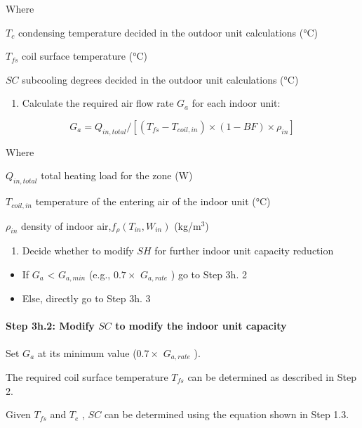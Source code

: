 Where

\(T_c\) condensing temperature decided in the outdoor unit calculations (°C)

\(T_{fs}\) coil surface temperature (°C)

\(SC\) subcooling degrees decided in the outdoor unit calculations (°C)

\begin{enumerate}
\def\labelenumi{\arabic{enumi})}
\setcounter{enumi}{1}
\tightlist
\item
  Calculate the required air flow rate \(G_a\) for each indoor unit:
\end{enumerate}

\begin{equation}
G_a = Q_{in,total}/[(T_{fs}-T_{coil,in})\times{(1-BF)}\times{\rho_{in}}]
\end{equation}

Where

\(Q_{in,total}\) total heating load for the zone (W)

\(T_{coil,in}\) temperature of the entering air of the indoor unit (°C)

\(\rho_{in}\) density of indoor air,\(f_{\rho}(T_{in},W_{in})\) (kg/m\(^{3}\))

\begin{enumerate}
\def\labelenumi{\arabic{enumi})}
\setcounter{enumi}{2}
\tightlist
\item
  Decide whether to modify \(SH\) for further indoor unit capacity reduction
\end{enumerate}

\begin{itemize}
\item
  If \(G_a\) \textless{} \(G_{a,min}\) (e.g., \(0.7\times\) \(G_{a,rate}\) ) go to Step 3h. 2
\item
  Else, directly go to Step 3h. 3
\end{itemize}

\paragraph{Step 3h.2: Modify \(SC\) to modify the indoor unit capacity}\label{step-3h.2-modify-sc-to-modify-the-indoor-unit-capacity}

Set \(G_a\) at its minimum value (\(0.7\times\) \(G_{a,rate}\) ).

The required coil surface temperature \(T_{fs}\) can be determined as described in Step 2.

Given \(T_{fs}\) and \(T_e\) , \(SC\) can be determined using the equation shown in Step 1.3.

